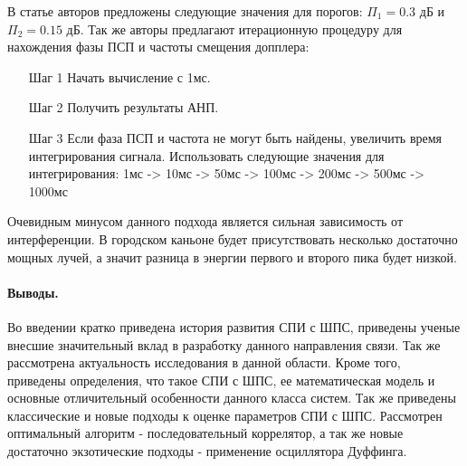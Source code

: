 В статье авторов \cite{2max_ieee} предложены следующие значения для порогов:
${\Pi_1} = 0.3$ дБ и  ${\Pi_2} = 0.15$ дБ. Так же авторы предлагают итерационную процедуру для нахождения
фазы ПСП и частоты смещения допплера:
\begin{itemize}
\item[Шаг 1] Начать вычисление с 1мс.
\item[Шаг 2] Получить результаты АНП.
\item[Шаг 3] Если фаза ПСП и частота не могут быть найдены, увеличить время интегрирования сигнала.
	Использовать следующие значения для интегрирования: 1мс -> 10мс -> 50мс -> 100мс -> 200мс ->
	500мс -> 1000мс
\end{itemize}

Очевидным минусом данного подхода является сильная зависимость от интерференции. В городском каньоне будет присутствовать
несколько достаточно мощных лучей, а значит разница в энергии первого и второго пика будет низкой.

\paragraph{Выводы.}

Во введении кратко приведена история развития СПИ с ШПС, приведены ученые внесшие значительный вклад в разработку данного направления связи. Так же рассмотрена
актуальность исследования в данной области. Кроме того, приведены определения, что такое СПИ с ШПС, ее математическая модель и основные отличительный особенности данного класса систем.
Так же приведены классические и новые подходы к оценке параметров СПИ с ШПС. Рассмотрен оптимальный алгоритм - последовательный коррелятор,
а так же новые достаточно экзотические подходы - применение осциллятора Дуффинга. 

\newpage
